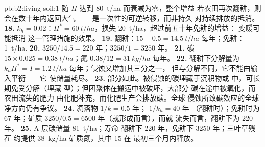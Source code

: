 \begin{solution}{pb:b2:living-soil:1}
随 $H$ 达到 \qty{80}{t/ha} 而衰减为零，整个增益
若农田再次翻耕，则会在数十年内返回大气
——是一次性的可逆转移，而非持久
对持续排放的抵消。
\textbf{18.} $k_h = 0.02$：$H^{*} = \qty{60}{t/ha}$，损失
\qty{20}{t/ha}，超过前五十年免耕的增益：
变暖可能抵消
这一管理措施的效果。
\textbf{19.} 翻耕：$15 - 0.5 = \qty{14.5}{t/ha}$ 每年；免耕：
\qty{1}{t/ha}.
\textbf{20.} $3250/14.5 = 220$ 年；$3250/1 = 3250$ 年。
\textbf{21.} 碳 $15\times 0.025 = \qty{0.38}{t/ha}$；氮
$0.38/12 = \qty{31}{kg/ha}$ 每年。
\textbf{22.} 翻耕下分解量为 $k_hH^{*} =
I = \qty{1.2}{t/ha}$ 每年；侵蚀又增加其三分之一，
但与分解不同，它不能由输入平衡——它
使储量耗尽。
\textbf{23.} 部分如此。被侵蚀的碳埋藏于沉积物或
中，可长期免受分解（埋藏
型）；但团聚体在搬运中被破坏，大部分
碳在途中被氧化，而农田流失的肥力
由化肥补充，而化肥生产会排放碳。全球
侵蚀所致碳效应的全球净方向仍有争议。
\textbf{24.} 凋落物 $1/k = 0.5$ 年； $1/k_h = 40$ 年
（翻耕时）；免耕时为 67 年；矿质 $3250/0.5 =
6500$ 年（就形成而言），而就
流失而言，翻耕下为 220 年。
\textbf{25.} A 层碳储量 \qty{81}{t/ha}；寿命
翻耕下 220 年，免耕下 3250 年；三叶草残茬
约提供 \qty{38}{kg/ha} 矿质氮，其中 15 在
最初三个月内释放。
\end{solution}
